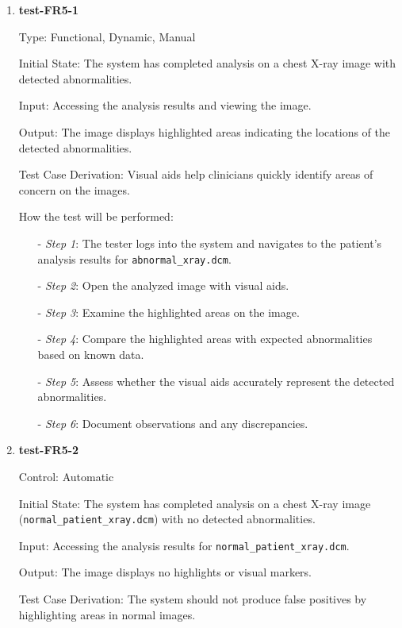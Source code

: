 \documentclass[12pt, titlepage]{article}
\begin{document}
\begin{enumerate}

\item \textbf{test-FR5-1} \label{test-FR5-1}

Type: Functional, Dynamic, Manual

Initial State: The system has completed analysis on a chest X-ray image with detected abnormalities.

Input: Accessing the analysis results and viewing the image.

Output: The image displays highlighted areas indicating the locations of the detected abnormalities.

Test Case Derivation: Visual aids help clinicians quickly identify areas of concern on the images.

How the test will be performed:
\begin{itemize}
  \item[-] \textit{Step 1}: The tester logs into the system and navigates to the patient's analysis results for \texttt{abnormal\_xray.dcm}.
  \item[-] \textit{Step 2}: Open the analyzed image with visual aids.
  \item[-] \textit{Step 3}: Examine the highlighted areas on the image.
  \item[-] \textit{Step 4}: Compare the highlighted areas with expected abnormalities based on known data.
  \item[-] \textit{Step 5}: Assess whether the visual aids accurately represent the detected abnormalities.
  \item[-] \textit{Step 6}: Document observations and any discrepancies.
\end{itemize}

\item \textbf{test-FR5-2} \label{test-FR5-2}

Control: Automatic

Initial State: The system has completed analysis on a chest X-ray image (\texttt{normal\_patient\_xray.dcm}) with no detected abnormalities.

Input: Accessing the analysis results for \texttt{normal\_patient\_xray.dcm}.

Output: The image displays no highlights or visual markers.

Test Case Derivation: The system should not produce false positives by highlighting areas in normal images.


\end{enumerate}
\end{document}
